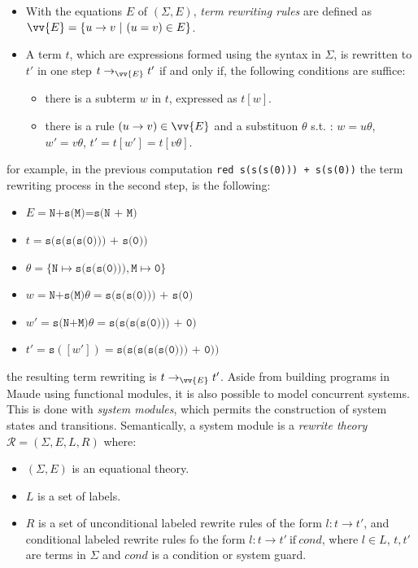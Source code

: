 \begin{itemize}
    \item With the equations $E$ of $(\Sigma, E)$, \textit{term rewriting rules} are defined as $\vv{E} = \{u \rightarrow v  \ | \ (u = v) \in E \}$. 
    \item A term $t$, which are expressions formed using the syntax in $\Sigma$, is rewritten to $t'$ in one step $t \rightarrow_{\vv{E}} t'$ if and only if, the following conditions are suffice:
        \begin{itemize}
            \item there is a subterm $w$ in $t$, expressed as $t[w]$.
            \item there is a rule $(u \rightarrow v) \in \vv{E}$ and a substituon $\theta$ s.t. : $w = u\theta$, $w' = v\theta$, $t'=t[w']=t[v\theta]$.   
        \end{itemize}
\end{itemize}
for example, in the previous computation \texttt{red s(s(s(0))) + s(s(0))} the term rewriting process in the second step, is the following:
\begin{itemize}
    \item $E = \texttt{N+s(M)=s(N + M)}$
    \item $t = \texttt{s(s(s(s(0))) + s(0))}$
    \item $\theta = \{\texttt{N} \mapsto \texttt{s(s(s(0)))},\texttt{M} \mapsto \texttt{0} \}$
    \item $w = \texttt{N+s(M)}\theta = \texttt{s(s(s(0))) + s(0)}$
    \item $w' = \texttt{s(N+M)}\theta = \texttt{s(s(s(s(0))) + 0)}$
    \item $t' = \texttt{s}([w']) = \texttt{s(s(s(s(s(0))) + 0))}$
\end{itemize}
the resulting term rewriting is $t \rightarrow_{\vv{E}} t'$.
Aside from building programs in Maude using functional modules, it is also possible to model concurrent systems. This is done with \textit{system modules}, which permits the construction of system states and transitions. Semantically, a system module is a \textit{rewrite theory} \cite{PeterMaude,Lecture3} $\mathscr{R} = (\Sigma, E, L, R)$ where: 
\begin{itemize}
    \item $(\Sigma, E)$ is an equational theory.
    \item $L$ is a set of labels.
    \item $R$ is a set of unconditional labeled rewrite rules of the form $l: t \rightarrow t'$, and conditional labeled rewrite rules fo the form $l: t \rightarrow t' \ \text{if} \ cond$, where $l \in L$, $t,t'$ are terms in $\Sigma$ and $cond$ is a condition or system guard.    
\end{itemize}
